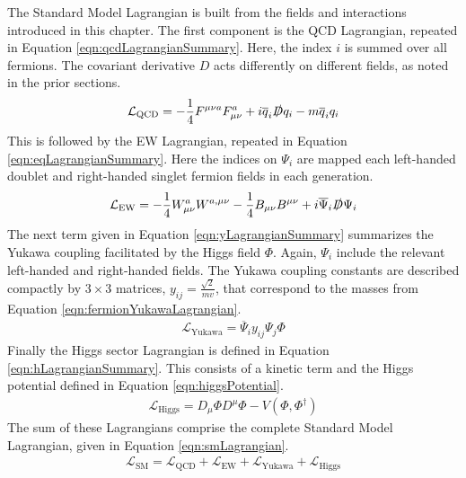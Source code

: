 The Standard Model Lagrangian is built from the fields and interactions introduced in this chapter.
The first component is the QCD Lagrangian, repeated in Equation \ref{eqn:qcdLagrangianSummary}.
Here, the index $i$ is summed over all fermions.
The covariant derivative $D$ acts differently on different fields, as noted in the prior sections. 
\begin{equation}\begin{split}\label{eqn:qcdLagrangianSummary}
    \mathcal{L}_\text{QCD}=-\frac{1}{4}F^{\mu\nu a}F^a_{\mu\nu}+i\overline{q}_i\slashed{D}q_i-m\overline{q}_iq_i \\
\end{split}\end{equation}
%
This is followed by the EW Lagrangian, repeated in Equation \ref{eqn:eqLagrangianSummary}.
Here the indices on $\Psi_i$ are mapped each left-handed doublet and right-handed singlet fermion fields in each generation.
\begin{equation}\begin{split}\label{eqn:eqLagrangianSummary}
    \mathcal{L}_\text{EW}=-\frac{1}{4}W^a_{\mu\nu}W^{a,\mu\nu}-\frac{1}{4}B_{\mu\nu}B^{\mu\nu}+i\overline{\Psi}_i\slashed{D}\Psi_i
\end{split}\end{equation}
%
The next term given in Equation \ref{eqn:yLagrangianSummary} summarizes the Yukawa coupling facilitated by the Higgs field $\Phi$.
Again, $\Psi_i$ include the relevant left-handed and right-handed fields.
The Yukawa coupling constants are described compactly by $3\times3$ matrices, $y_{ij}=\frac{\sqrt{2}}{mv}$, that correspond to the masses from Equation \ref{eqn:fermionYukawaLagrangian}.
\begin{equation}\begin{split}\label{eqn:yLagrangianSummary}
    \mathcal{L}_\text{Yukawa}=\overline{\Psi}_iy_{ij}\Psi_j\Phi
\end{split}\end{equation}
%
Finally the Higgs sector Lagrangian is defined in Equation \ref{eqn:hLagrangianSummary}.
This consists of a kinetic term and the Higgs potential defined in Equation \ref{eqn:higgsPotential}.
\begin{equation}\begin{split}\label{eqn:hLagrangianSummary}
    \mathcal{L}_\text{Higgs}=D_\mu\Phi D^\mu\Phi-V(\Phi,\Phi^\dagger)
\end{split}\end{equation}
%
The sum of these Lagrangians comprise the complete Standard Model Lagrangian, given in Equation \ref{eqn:smLagrangian}.
\begin{equation}\begin{split}\label{eqn:smLagrangian}
    \boxed{\mathcal{L}_\text{SM}=\mathcal{L}_\text{QCD}+\mathcal{L}_\text{EW}+\mathcal{L}_\text{Yukawa}+\mathcal{L}_\text{Higgs}}
\end{split}\end{equation} 


